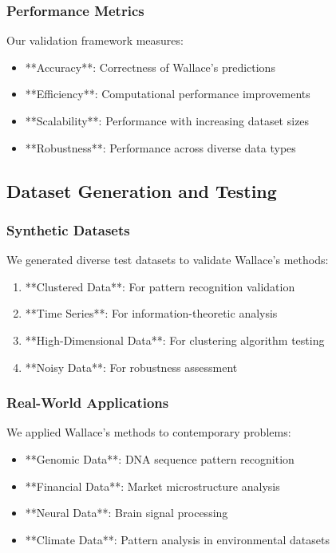 \documentclass[12pt]{article}
\begin{document}
\subsubsection{Performance Metrics}

Our validation framework measures:

\begin{itemize}
    \item **Accuracy**: Correctness of Wallace's predictions
    \item **Efficiency**: Computational performance improvements
    \item **Scalability**: Performance with increasing dataset sizes
    \item **Robustness**: Performance across diverse data types
\end{itemize}

\subsection{Dataset Generation and Testing}

\subsubsection{Synthetic Datasets}

We generated diverse test datasets to validate Wallace's methods:

\begin{enumerate}
    \item **Clustered Data**: For pattern recognition validation
    \item **Time Series**: For information-theoretic analysis
    \item **High-Dimensional Data**: For clustering algorithm testing
    \item **Noisy Data**: For robustness assessment
\end{enumerate}

\subsubsection{Real-World Applications}

We applied Wallace's methods to contemporary problems:

\begin{itemize}
    \item **Genomic Data**: DNA sequence pattern recognition
    \item **Financial Data**: Market microstructure analysis
    \item **Neural Data**: Brain signal processing
    \item **Climate Data**: Pattern analysis in environmental datasets
\end{itemize}
\end{document}
